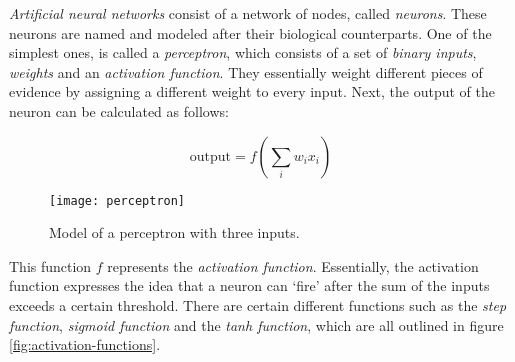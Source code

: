 \textit{Artificial neural networks} consist of a network of nodes, called \textit{neurons}.
These neurons are named and modeled after their biological counterparts.
One of the simplest ones, is called a \textit{perceptron}, which consists of a set of \textit{binary inputs}, \textit{weights} and an \textit{activation function}.
They essentially weight different pieces of evidence by assigning a different weight to every input.
Next, the output of the neuron can be calculated as follows:

$$\text{output} = f(\sum_{i} w_i x_i)$$

\begin{figure}[ht]
  \centering
  \texttt{[image: perceptron]}
  \caption{Model of a perceptron with three inputs.}
  \label{fig:perceptron}
\end{figure}

\newpage

This function $f$ represents the \textit{activation function}.
Essentially, the activation function expresses the idea that a neuron can `fire' after the sum of the inputs exceeds a certain threshold.
There are certain different functions such as the \textit{step function}, \textit{sigmoid function} and the \textit{tanh function},
which are all outlined in figure \ref{fig:activation-functions}.

